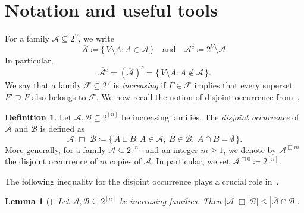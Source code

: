 \documentclass[11pt]{article}
\newtheorem{lemma}[theorem]{Lemma}
\theoremstyle{definition}
\newtheorem{defn}[theorem]{Definition}
\begin{document}
\section{Notation and useful tools}
For a family $\mathcal{A}\subseteq 2^{V}$, we write
\[
   \overline{\mathcal{A}}
   \coloneqq
   \{\, V\setminus A : A\in\mathcal{A}\,\}
   \quad\text{and}\quad
   \mathcal{A}^c
   \coloneqq
   2^{V}\setminus\mathcal{A}.
\]
In particular, 
\[
   \overline{\mathcal{A}^c}
   = (\overline{\mathcal{A}})^c
   = \{\, V\setminus A : A\notin\mathcal{A}\,\}.
\]
We say that a family \(\mathcal{F}\subseteq 2^{V}\) is \emph{increasing} if \(F\in\mathcal{F}\) implies that every superset \(F'\supseteq F\) also belongs to \(\mathcal{F}\). We now recall the notion of disjoint occurrence from~\cite{2018BLMS}.
\begin{defn}
Let $\mathcal{A},\mathcal{B}\subseteq 2^{[n]}$ be increasing families.  
The \emph{disjoint occurrence} of $\mathcal{A}$ and $\mathcal{B}$ is defined as
\[
  \mathcal{A}\;\Box\;\mathcal{B}
  \coloneqq 
  \{\,A\sqcup B : A\in\mathcal{A},\ B\in\mathcal{B},\ A\cap B=\emptyset\,\}.
\]
More generally, for a family $\mathcal{A}\subseteq 2^{[n]}$ and an integer $m\ge 1$, we denote by
$\mathcal{A}^{\Box m}$ the disjoint occurrence of $m$ copies of $\mathcal{A}$.  
In particular, we set $\mathcal{A}^{\Box 0}\coloneqq 2^{[n]}$.
\end{defn}
The following inequality for the disjoint occurrence plays a crucial role in~\cite{2018BLMS}.
\begin{lemma}[\cite{2018BLMS}]\label{lem:ineq of disjoint occ}
    Let $\mathcal{A},\mathcal{B}\subseteq 2^{[n]}$ be increasing families. Then $|\mathcal{A}\;\Box\; \mathcal{B}|\le |\overline{\mathcal{A}}\cap \mathcal{B}|$.
\end{lemma}
\end{document}
